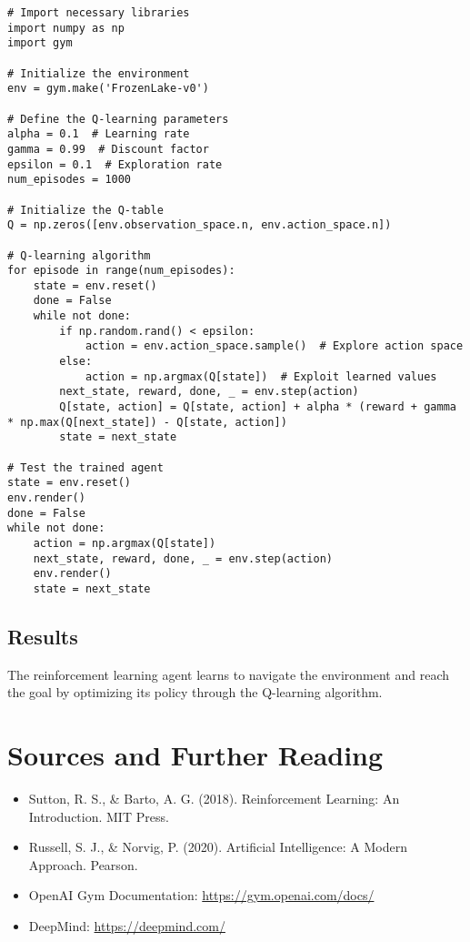 \begin{verbatim}
# Import necessary libraries
import numpy as np
import gym

# Initialize the environment
env = gym.make('FrozenLake-v0')

# Define the Q-learning parameters
alpha = 0.1  # Learning rate
gamma = 0.99  # Discount factor
epsilon = 0.1  # Exploration rate
num_episodes = 1000

# Initialize the Q-table
Q = np.zeros([env.observation_space.n, env.action_space.n])

# Q-learning algorithm
for episode in range(num_episodes):
    state = env.reset()
    done = False
    while not done:
        if np.random.rand() < epsilon:
            action = env.action_space.sample()  # Explore action space
        else:
            action = np.argmax(Q[state])  # Exploit learned values
        next_state, reward, done, _ = env.step(action)
        Q[state, action] = Q[state, action] + alpha * (reward + gamma * np.max(Q[next_state]) - Q[state, action])
        state = next_state

# Test the trained agent
state = env.reset()
env.render()
done = False
while not done:
    action = np.argmax(Q[state])
    next_state, reward, done, _ = env.step(action)
    env.render()
    state = next_state
\end{verbatim}

\subsection{Results}
The reinforcement learning agent learns to navigate the environment and reach the goal by optimizing its policy through the Q-learning algorithm.

\section{Sources and Further Reading}
\begin{itemize}
    \item Sutton, R. S., & Barto, A. G. (2018). Reinforcement Learning: An Introduction. MIT Press.
    \item Russell, S. J., & Norvig, P. (2020). Artificial Intelligence: A Modern Approach. Pearson.
    \item OpenAI Gym Documentation: \url{https://gym.openai.com/docs/}
    \item DeepMind: \url{https://deepmind.com/}
\end{itemize}

